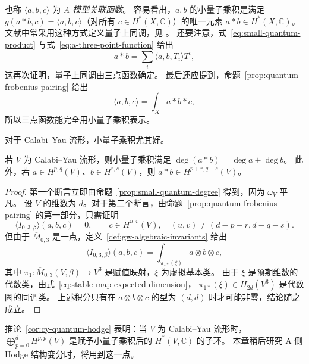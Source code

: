 也称 $\langle a,b,c\rangle$ 为 \emph{A 模型关联函数}。
容易看出，$a,b$ 的小量子乘积是满足
$g(a*b,c)=\langle a,b,c\rangle$（对所有 $c\in H^*(X,\mathbb C)$）的唯一元素 $a*b\in H^*(X,\mathbb C)$。
文献中常采用这种方式定义量子上同调，见 。
还要注意，式~\eqref{eq:small-quantum-product} 与式~\eqref{eq:a-three-point-function} 给出
\begin{equation}\label{eq:small-product-from-correlations}
a*b=\sum_i\langle a,b,T_i\rangle T^i,
\end{equation}
这再次证明，量子上同调由三点函数确定。
最后还应提到，命题~\ref{prop:quantum-frobenius-pairing} 给出
\begin{equation}\label{eq:three-point-quantum-integral}
\langle a,b,c\rangle=\int_Xa*b*c,
\end{equation}
所以三点函数能完全用小量子乘积表示。

对于 Calabi--Yau 流形，小量子乘积尤其好。
\begin{corollary}\label{cor:cy-quantum-hodge}
若 $V$ 为 Calabi--Yau 流形，则小量子乘积满足 $\deg(a*b)=\deg a+\deg b$。
此外，若 $a\in H^{p,q}(V)$、$b\in H^{r,s}(V)$，则 $a*b\in H^{p+r,q+s}(V)$。
\end{corollary}
\begin{proof}
第一个断言立即由命题~\ref{prop:small-quantum-degree} 得到，因为 $\omega_V$ 平凡。
设 $V$ 的维数为 $d$。对于第二个断言，由命题~\ref{prop:quantum-frobenius-pairing} 的第一部分，只需证明
\[
\langle I_{0,3,\beta}\rangle(a,b,c)=0,
\qquad c\in H^{u,v}(V),\quad(u,v)\ne(d-p-r,d-q-s).
\]
但由于 $\overline M_{0,3}$ 是一点，定义~\ref{def:gw-algebraic-invariants} 给出
\[
\langle I_{0,3,\beta}\rangle(a,b,c)=\int_{\pi_{1*}(\xi)}a\otimes b\otimes c,
\]
其中 $\pi_1:\overline M_{0,3}(V,\beta)\to V^3$ 是赋值映射，$\xi$ 为虚拟基本类。
由于 $\xi$ 是预期维数的代数类，由式~\eqref{eq:stable-map-expected-dimension}，
$\pi_{1*}(\xi)\in H_{2d}(V^3)$ 是代数圈的同调类。
上述积分只有在 $a\otimes b\otimes c$ 的型为 $(d,d)$ 时才可能非零，结论随之成立。
\end{proof}
推论~\ref{cor:cy-quantum-hodge} 表明：当 $V$ 为 Calabi--Yau 流形时，
$\bigoplus_{p=0}^dH^{p,p}(V)$ 是赋予小量子乘积后的 $H^*(V,\mathbb C)$ 的子环。
本章稍后研究 A 侧 Hodge 结构变分时，将用到这一点。

